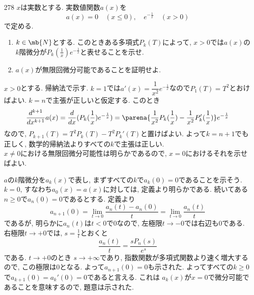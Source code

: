\begin{prob}{278}{}{}
    $x$は実数とする. 実数値関数$a(x)$を
    \[
    a(x) = 0 \quad (x\leq 0),\quad e^{-\frac{1}{x}} \quad (x>0)
    \]
    で定める. 
    \begin{enumerate}
        \item $k\in \mb{N}$とする. このときある多項式$P_k(T)$によって, $x>0$では$a(x)$の$k$階微分が$P_k(\frac{1}{x}) e^{-\frac{1}{x}}$と表せることを示せ. 
        \item $a(x)$が無限回微分可能であることを証明せよ.
    \end{enumerate}
\end{prob}
 $x>0$とする. 
帰納法で示す. $k=1$では$a'(x) = \dfrac{1}{x^2} e^{-\frac{1}{x}}$なので$P_1(T) = T^2$とおけばよい. $k=n$で主張が正しいと仮定する. このとき
\[
\dfrac{d^{k+1}}{dx^{k+1}} a(x) = \dfrac{d}{dx} (P_k(\frac{1}{x})e^{-\frac{1}{x}}) = \parena{ \dfrac{1}{x^2} P_k(\frac{1}{x}) - \dfrac{1}{x^2} P_k'(\frac{1}{x})  }e^{-\frac{1}{x}}     
\]
なので, $P_{k+1}(T) = T^2 P_k(T) - T^2 P_k'(T)$と置けばよい. よって$k=n+1$でも正しく, 数学的帰納法よりすべての$k$で主張は正しい. \\
$x\neq 0$における無限回微分可能性は明らかであるので, $x=0$におけるそれを示せばよい.\par 
$a$の$k$階微分を$a_k(x)$で表し, まずすべての$k$で$a_k(0) = 0$であることを示そう. $k=0$, すなわち$a_0(x) = a(x)$に対しては, 定義より明らかである. 
続いてある$n\geq 0$で$a_n(0) = 0$であるとする. 定義より
\[a_{n+1}(0) = \lim_{t\to 0} \dfrac{a_{n}(t) - a_{n}(0)}{t} = \lim_{t\to 0} \dfrac{a_n(t)}{t}\]
であるが, 明らかに$a_n(t)$は$t<0$で0なので, 左極限$t\to -0$では右辺も$0$である. 右極限$t\to +0$では, $s=\frac{1}{t}$とおくと
\[
   \dfrac{a_n(t)}{t} = \dfrac{sP_n(s)}{e^{s}}
\]
である. $t\to +0$のとき $s\to +\infty$であり, 指数関数が多項式関数より速く増大するので, この極限は0となる. よって$a_{n+1}(0) = 0$も示された. 
よってすべての$k\geq 0$で$a_{k+1}(0) = a_k'(0) = 0$であると言える. これは $a_{k}(x)$が$x=0$で微分可能であることを意味するので, 題意は示された. 